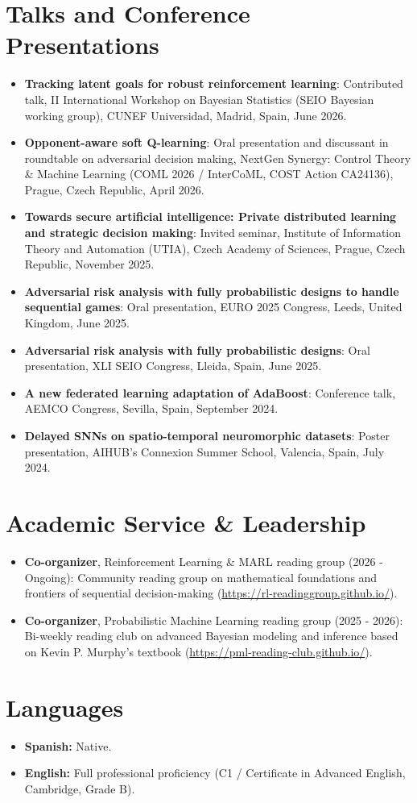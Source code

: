 \documentclass[paper=a4,fontsize=11pt]{scrartcl} %
\newcommand{\NewPart}[1]{\section*{#1}}
\begin{document}
\NewPart{Talks and Conference Presentations}
\begin{itemize}
    \setlength\itemsep{0.2em}
    \item \textbf{Tracking latent goals for robust reinforcement learning}: Contributed talk, II International Workshop on Bayesian Statistics (SEIO Bayesian working group), CUNEF Universidad, Madrid, Spain, June 2026.
    
    \item \textbf{Opponent-aware soft Q-learning}: Oral presentation and discussant in roundtable on adversarial decision making, NextGen Synergy: Control Theory \& Machine Learning (COML 2026 / InterCoML, COST Action CA24136), Prague, Czech Republic, April 2026.
    
    \item \textbf{Towards secure artificial intelligence: Private distributed learning and strategic decision making}: Invited seminar, Institute of Information Theory and Automation (UTIA), Czech Academy of Sciences, Prague, Czech Republic, November 2025.
    
    \item \textbf{Adversarial risk analysis with fully probabilistic designs to handle sequential games}: Oral presentation, EURO 2025 Congress, Leeds, United Kingdom, June 2025. 
    
    \item \textbf{Adversarial risk analysis with fully probabilistic designs}: Oral presentation, XLI SEIO Congress, Lleida, Spain, June 2025.

    \item \textbf{A new federated learning adaptation of AdaBoost}: Conference talk, AEMCO Congress, Sevilla, Spain, September 2024.

    \item \textbf{Delayed SNNs on spatio-temporal neuromorphic datasets}: Poster presentation, AIHUB's Connexion Summer School, Valencia, Spain, July 2024.
\end{itemize}

\NewPart{Academic Service \& Leadership}
\begin{itemize}
    \setlength\itemsep{0.2em}
    \item \textbf{Co-organizer}, Reinforcement Learning \& MARL reading group (2026 - Ongoing): Community reading group on mathematical foundations and frontiers of sequential decision-making (\url{https://rl-readinggroup.github.io/}).
    \item \textbf{Co-organizer}, Probabilistic Machine Learning reading group (2025 - 2026): Bi-weekly reading club on advanced Bayesian modeling and inference based on Kevin P. Murphy's textbook (\url{https://pml-reading-club.github.io/}).
\end{itemize}

\NewPart{Languages}
\begin{itemize}
    \setlength\itemsep{0.2em}
    \item \textbf{Spanish:} Native.
    \item \textbf{English:} Full professional proficiency (C1 / Certificate in Advanced English, Cambridge, Grade B).
\end{itemize}
\end{document}
